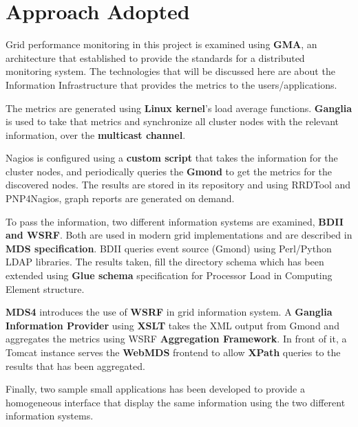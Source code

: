 
\section{Approach Adopted}

Grid performance monitoring in this project is examined using {\bf GMA}, an architecture that established to provide the standards for a distributed monitoring system. The technologies that will be discussed here are about the Information Infrastructure that provides the metrics to the users/applications.

The metrics are generated using {\bf Linux kernel}'s load average functions. {\bf Ganglia} is used to take that metrics and synchronize all cluster nodes with the relevant information, over the {\bf multicast channel}.

Nagios is configured using a {\bf custom script} that takes the information for the cluster nodes, and periodically queries the {\bf Gmond} to get the metrics for the discovered nodes. The results are stored in its repository and using RRDTool and PNP4Nagios, graph reports are generated on demand.

To pass the information, two different information systems are examined, {\bf BDII and WSRF}. Both are used in modern grid implementations and are described in {\bf MDS specification}. BDII queries event source (Gmond) using Perl/Python LDAP libraries. The results taken, fill the directory schema which has been extended using {\bf Glue schema} specification for Processor Load in Computing Element structure.

{\bf MDS4} introduces the use of {\bf WSRF} in grid information system. A {\bf Ganglia Information Provider} using {\bf XSLT} takes the XML output from Gmond and aggregates the metrics using WSRF {\bf Aggregation Framework}. In front of it, a Tomcat instance serves the {\bf WebMDS} frontend to allow {\bf XPath} queries to the results that has been aggregated.

Finally, two sample small applications has been developed to provide a homogeneous interface that display the same information using the two different information systems.

